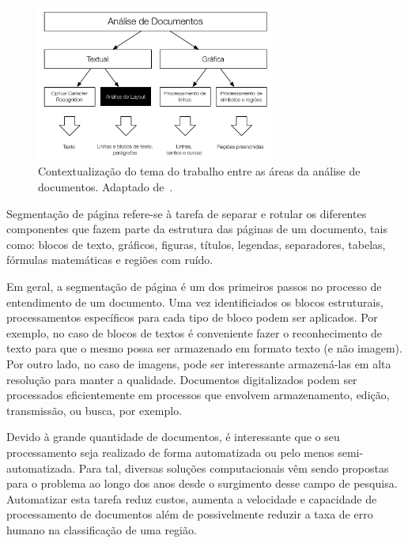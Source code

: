 \documentclass[a4paper,11pt]{article}
\begin{document}
\begin{figure}[htb]
\begin{center}
\includegraphics[width=0.7\textwidth]{assets/document_processing_areas_hierarquies.pdf}
\end{center}
\caption{Contextualização do tema do trabalho entre as áreas da
  análise de documentos. Adaptado de~\cite{Kasturi_OGorman_Govindaraju_2002}.}
\label{fig:context1}
\end{figure}

Segmentação de página refere-se à tarefa de separar e rotular os diferentes
componentes que fazem parte da estrutura das páginas de um
documento, tais como: blocos de texto, gráficos, figuras, títulos,
legendas, separadores, tabelas, fórmulas matemáticas e regiões com
ruído.

Em geral, a segmentação de página é um dos primeiros passos no
processo de entendimento de um documento. Uma vez identificiados os
blocos estruturais, processamentos específicos para cada tipo de bloco
podem ser aplicados. Por exemplo, no caso de blocos de textos é
conveniente fazer o reconhecimento de texto para que o mesmo possa ser
armazenado em formato texto (e não imagem). Por outro lado, no caso de
imagens, pode ser interessante armazená-las em alta resolução para
manter a qualidade. Documentos digitalizados podem ser processados
eficientemente em processos que envolvem armazenamento, edição,
transmissão, ou busca, por exemplo.

Devido à grande quantidade de documentos, é interessante que o seu
processamento seja realizado de forma automatizada ou pelo menos
semi-automatizada. Para tal, diversas soluções computacionais vêm
sendo propostas para o problema ao longo dos anos desde o surgimento
desse campo de pesquisa. Automatizar esta tarefa reduz custos, aumenta
a velocidade e capacidade de processamento de documentos além de
possivelmente reduzir a taxa de erro humano na classificação de uma
região.
\end{document}
